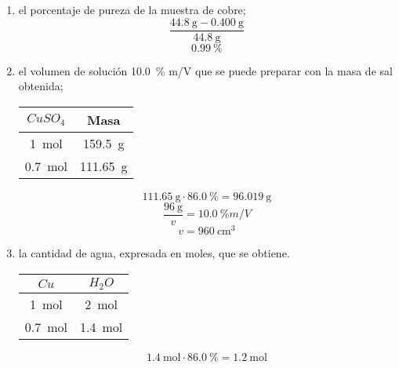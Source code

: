 \documentclass[../Práctica.root.tex]{subfiles}
\begin{document}
\begin{enumerate}
\begin{enumerate}
\begin{enumerate}[label=\roman*)]
                        \item el porcentaje de pureza de la muestra de cobre;
                              \[ \frac{\SI{44,8}{\g}-\SI{0,400}{\g}}{\SI{44,8}{\g}} \]
                              \[ \boxed{\SI{0,99}{\percent}} \]

                        \item el volumen de solución \SI{10,0}{\percent} m/V que se puede preparar con la masa de sal obtenida;
                              \begin{center}
                                  \begin{tabular}{c|c}
                                      $CuSO_4$        & Masa            \\
                                      \hline
                                      \SI{1}{\mole}   & \SI{159,5}{\g}  \\
                                      \SI{0,7}{\mole} & \SI{111,65}{\g} \\
                                  \end{tabular}
                              \end{center}
                              \[ \SI{111,65}{\g}\cdot\SI{86,0}{\percent} = \SI{96,019}{\g} \]
                              \[ \frac{\SI{96}{\g}}{v} = \SI{10,0}{\percent} m/V \]
                              \[ \boxed{v = \SI{960}{\cm\cubed}} \]

                        \item la cantidad de agua, expresada en moles, que se obtiene.
                              \begin{center}

                                  \begin{tabular}{c|c}
                                      $Cu$            & $H_2O$          \\
                                      \hline
                                      \SI{1}{\mole}   & \SI{2}{\mole}   \\
                                      \SI{0,7}{\mole} & \SI{1,4}{\mole} \\
                                  \end{tabular}
                              \end{center}
                              \[ \SI{1,4}{\mole}\cdot\SI{86,0}{\percent} = \boxed{\SI{1,2}{\mole}} \]
                    \end{enumerate}
          \end{enumerate}


\end{enumerate}
\end{document}
